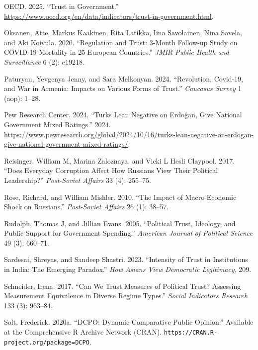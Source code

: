 \documentclass[
  12pt,
]{article}
\newlength{\cslhangindent}
\newenvironment{CSLReferences}[2] %
 {\begin{list}{}{%
  \setlength{\itemindent}{0pt}
  \setlength{\leftmargin}{0pt}
  \setlength{\parsep}{0pt}
  \ifodd #1
   \setlength{\leftmargin}{\cslhangindent}
   \setlength{\itemindent}{-1\cslhangindent}
  \fi
  \setlength{\itemsep}{#2\baselineskip}}}
 {\end{list}}
\begin{document}
\begin{CSLReferences}{1}{0}
OECD. 2025. {``Trust in Government.''} \url{https://www.oecd.org/en/data/indicators/trust-in-government.html}.

Oksanen, Atte, Markus Kaakinen, Rita Latikka, Iina Savolainen, Nina Savela, and Aki Koivula. 2020. {``Regulation and Trust: 3-Month Follow-up Study on COVID-19 Mortality in 25 European Countries.''} \emph{JMIR Public Health and Surveillance} 6 (2): e19218.

Paturyan, Yevgenya Jenny, and Sara Melkonyan. 2024. {``Revolution, Covid-19, and War in Armenia: Impacts on Various Forms of Trust.''} \emph{Caucasus Survey} 1 (aop): 1--28.

Pew Research Center. 2024. {``Turks Lean Negative on Erdoğan, Give National Government Mixed Ratings.''} 2024. \url{https://www.pewresearch.org/global/2024/10/16/turks-lean-negative-on-erdogan-give-national-government-mixed-ratings/}.

Reisinger, William M, Marina Zaloznaya, and Vicki L Hesli Claypool. 2017. {``Does Everyday Corruption Affect How Russians View Their Political Leadership?''} \emph{Post-Soviet Affairs} 33 (4): 255--75.

Rose, Richard, and William Mishler. 2010. {``The Impact of Macro-Economic Shock on Russians.''} \emph{Post-Soviet Affairs} 26 (1): 38--57.

Rudolph, Thomas J, and Jillian Evans. 2005. {``Political Trust, Ideology, and Public Support for Government Spending.''} \emph{American Journal of Political Science} 49 (3): 660--71.

Sardesai, Shreyas, and Sandeep Shastri. 2023. {``Intensity of Trust in Institutions in India: The Emerging Paradox.''} \emph{How Asians View Democratic Legitimacy}, 209.

Schneider, Irena. 2017. {``Can We Trust Measures of Political Trust? Assessing Measurement Equivalence in Diverse Regime Types.''} \emph{Social Indicators Research} 133 (3): 963--84.

Solt, Frederick. 2020a. {``{DCPO}: Dynamic Comparative Public Opinion.''} Available at the Comprehensive R Archive Network (CRAN). \texttt{https://CRAN.R-project.org/package=DCPO}.


\end{CSLReferences}
\end{document}
